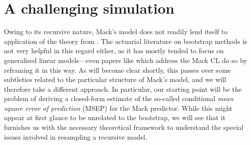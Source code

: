 \documentclass[a4paper]{book}
\begin{document}
\section{A challenging simulation} \label{sec:mack-challenge}

Owing to its recursive nature, Mack's model does not readily lend itself to application of the theory from . The actuarial literature on bootstrap methods is not very helpful in this regard either, as it has mostly tended to focus on generalised linear models---even papers like \cite{england:dist} which address the Mack CL do so by reframing it in this way. As will become clear shortly, this passes over some subtleties related to the particular structure of Mack's model, and we will therefore take a different approach. In particular, our starting point will be the problem of deriving a closed-form estimate of the so-called conditional \emph{mean square error of prediction} (MSEP) for the Mack predictor. While this might appear at first glance to be unrelated to the bootstrap, we will see that it furnishes us with the necessary theoretical framework to understand the special issues involved in resampling a recursive model.
\end{document}
